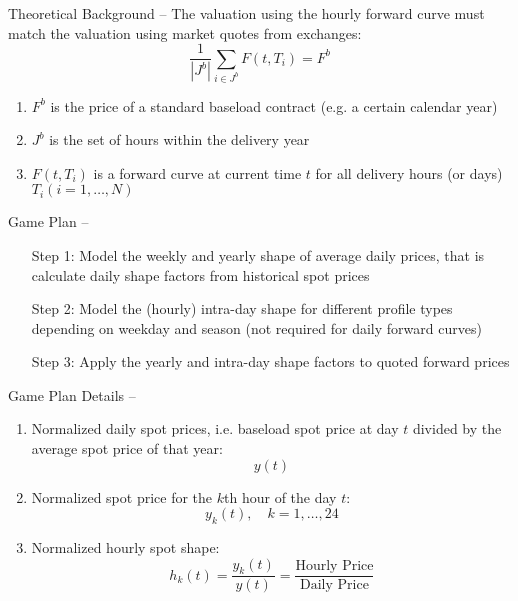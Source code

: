 \documentclass{beamer}
\begin{document}
\begin{frame}{Theoretical Background -- \cite{BurgerGraeberSchindlmayr-2014}}
    The valuation using the hourly forward curve must match the valuation using market quotes from exchanges:
    \[
        \frac{1}{|J^b|} \sum_{i \in J^b} F(t, T_i) = F^b
    \]
    \begin{enumerate}[label=--, itemsep=0.1cm]
        \item $F^b$ is the price of a standard baseload contract (e.g. a certain calendar year)

        \item $J^b$ is the set of hours within the delivery year

        \item $F(t, T_i)$ is a forward curve at current time $t$ for all delivery hours (or days) $T_i (i = 1, \ldots, N)$
    \end{enumerate}
\end{frame}


\begin{frame}{Game Plan -- \cite{BurgerGraeberSchindlmayr-2014}}
    \begin{enumerate}
        \item[Step 1:] Model the weekly and yearly shape of average daily prices, that is calculate daily shape factors from historical spot prices

        \item[Step 2:] Model the (hourly) intra-day shape for different profile types depending on weekday and season (not required for daily forward curves)

        \item[Step 3:] Apply the yearly and intra-day shape factors to quoted forward prices
    \end{enumerate}
\end{frame}


\begin{frame}{Game Plan Details -- \cite{BurgerGraeberSchindlmayr-2014}}
    \begin{enumerate}[label=$\bullet$, itemsep=0.1cm]
        \item Normalized daily spot prices, i.e. baseload spot price at day $t$ divided by the average spot price of that year:
              \[ y(t) \]

        \item Normalized spot price for the $k$th hour of the day $t$:
              \[ y_k(t), \quad k = 1, \ldots, 24 \]

        \item Normalized hourly spot shape:
              \[
                  h_k(t)
                  = \frac{y_k(t)}{y(t)}
                  = \frac{\text{Hourly Price}}{\text{Daily Price}}
              \]
    \end{enumerate}
\end{frame}
\end{document}
